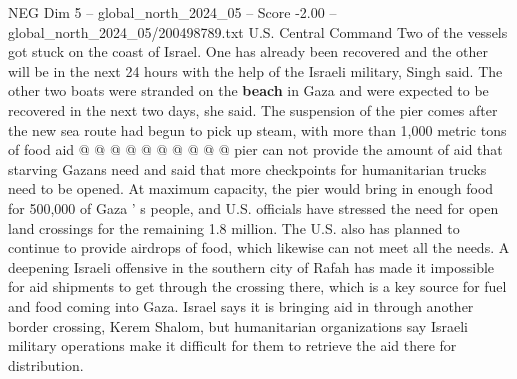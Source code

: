 \begin{textsample}{NEG Dim 5 – global\_north\_2024\_05 – Score -2.00 – global\_north\_2024\_05/200498789.txt}
U.S.
Central Command Two of the vessels got stuck on the coast of Israel.
One has already been recovered and the other will be in the next 24 hours with the help of the Israeli military, Singh said.
The other two boats were stranded on the \textbf{beach} in Gaza and were expected to be recovered in the next two days, she said.
The suspension of the pier comes after the new sea route had begun to pick up steam, with more than 1,000 metric tons of food aid @ @ @ @ @ @ @ @ @ @ pier can not provide the amount of aid that starving Gazans need and said that more checkpoints for humanitarian trucks need to be opened.
At maximum capacity, the pier would bring in enough food for 500,000 of Gaza ' s people, and U.S. officials have stressed the need for open land crossings for the remaining 1.8 million.
The U.S. also has planned to continue to provide airdrops of food, which likewise can not meet all the needs.
A deepening Israeli offensive in the southern city of Rafah has made it impossible for aid shipments to get through the crossing there, which is a key source for fuel and food coming into Gaza.
Israel says it is bringing aid in through another border crossing, Kerem Shalom, but humanitarian organizations say Israeli military operations make it difficult for them to retrieve the aid there for distribution.

\end{textsample}
